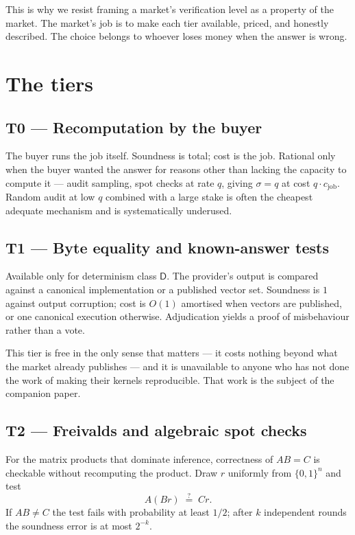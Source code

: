 \documentclass[11pt,a4paper]{article}
\begin{document}
\begin{remark}
This is why we resist framing a market's verification level as a property of the
market. The market's job is to make each tier available, priced, and honestly
described. The choice belongs to whoever loses money when the answer is wrong.
\end{remark}

\section{The tiers}

\subsection{T0 --- Recomputation by the buyer}

The buyer runs the job itself. Soundness is total; cost is the job. Rational
only when the buyer wanted the answer for reasons other than lacking the
capacity to compute it --- audit sampling, spot checks at rate $q$, giving
$\sigma = q$ at cost $q \cdot c_{\text{job}}$. Random audit at low $q$ combined
with a large stake is often the cheapest adequate mechanism and is systematically
underused.

\subsection{T1 --- Byte equality and known-answer tests}

Available only for determinism class $\mathsf{D}$. The provider's output is
compared against a canonical implementation or a published vector set.
Soundness is $1$ against output corruption; cost is $O(1)$ amortised when
vectors are published, or one canonical execution otherwise. Adjudication yields
a proof of misbehaviour rather than a vote.

This tier is free in the only sense that matters --- it costs nothing beyond
what the market already publishes --- and it is unavailable to anyone who has
not done the work of making their kernels reproducible. That work is the subject
of the companion paper.

\subsection{T2 --- Freivalds and algebraic spot checks}

For the matrix products that dominate inference, correctness of $AB = C$ is
checkable without recomputing the product. Draw $r$ uniformly from
$\{0,1\}^{n}$ and test
\begin{equation}
A(Br) \;\overset{?}{=}\; Cr .
\end{equation}
If $AB \neq C$ the test fails with probability at least $1/2$; after $k$
independent rounds the soundness error is at most $2^{-k}$.
\end{document}
